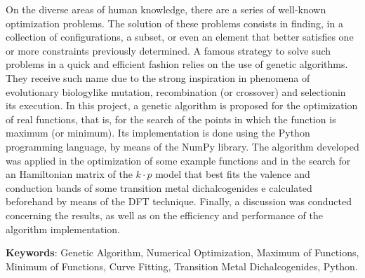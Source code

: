 On the diverse areas of human knowledge, there are a series of well-known optimization
problems. The solution of these problems consists in finding, in a collection of configurations,
a subset, or even an element that better satisfies one or more constraints previously determined. A
famous strategy to solve such problems in a quick and efficient fashion relies on the use of
genetic algorithms. They receive such name due to the strong inspiration in phenomena of
evolutionary biology\trav like mutation, recombination (or crossover) and selection\trav in its execution. 
In this project, a genetic algorithm is proposed for the
optimization of real functions, that is, for the search of the points in which the function is
maximum (or minimum). Its implementation is done using the Python programming language, by means of the NumPy library.
The algorithm developed was applied in the optimization of some example
functions and in the search for an Hamiltonian matrix of the $ k \cdot p $ model
that best fits the valence and conduction bands of some transition metal
dichalcogenides\trav {} e \trav calculated beforehand by means
of the DFT technique. Finally, a discussion was conducted concerning the
results, as well as on the efficiency and performance of the algorithm implementation.

\vspace{\onelineskip}\noindent
\textbf{Keywords}: Genetic Algorithm, Numerical Optimization, Maximum of
Functions, Minimum of Functions, Curve Fitting, Transition Metal Dichalcogenides,
Python.
